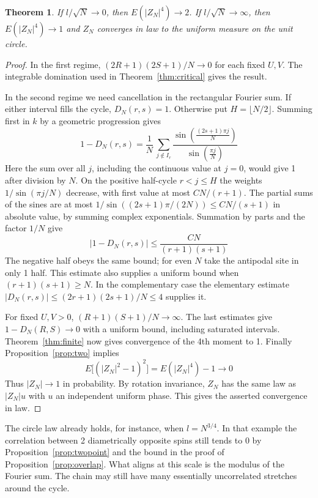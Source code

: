 \documentclass[11pt,a4paper]{article}
\newtheorem{thm}{Theorem}[section]
\theoremstyle{remark}
\begin{document}
\begin{samepage}
\begin{thm}\label{thm:sides}
If $l/\sqrt N\to0$, then $E(|Z_N|^4)\to2$. If $l/\sqrt N\to\infty$,
then $E(|Z_N|^4)\to1$ and $Z_N$ converges in law to the uniform measure
on the unit circle.
\end{thm}
\end{samepage}
\begin{proof}
In the first regime, $(2R+1)(2S+1)/N\to0$ for each fixed $U,V$. The
integrable domination used in Theorem~\ref{thm:critical} gives the result.

In the second regime we need cancellation in the rectangular Fourier sum.
If either interval fills the cycle, $D_N(r,s)=1$. Otherwise put
$H=\lfloor N/2\rfloor$. Summing first in $k$ by a geometric progression
gives
\[
   1-D_N(r,s)=\frac1N\,\sum_{j\notin I_r}
     \frac{\sin\left(\frac{(2s+1)\pi j}{N}\right)}{\sin\left(\frac{\pi j}{N}\right)}
\]
Here the sum over all $j$, including the continuous value at $j=0$,
would give 1 after division by $N$. On the positive half-cycle
$r<j\le H$ the weights $1/\sin(\pi j/N)$ decrease, with first value
at most $C N/(r+1)$. The partial sums of the sines are at most
$1/\sin((2s+1)\pi/(2N))\le C N/(s+1)$ in absolute value, by summing
complex exponentials. Summation by parts and the factor $1/N$ give
\[
    |1-D_N(r,s)|\le\frac{C N}{(r+1)(s+1)}
\]
The negative half obeys the same bound; for even $N$ take the antipodal
site in only 1 half. This estimate also supplies a uniform bound when
$(r+1)(s+1)\ge N$. In the complementary case the elementary estimate
$|D_N(r,s)|\le (2r+1)(2s+1)/N\le4$ supplies it.

For fixed $U,V>0$, $(R+1)(S+1)/N\to\infty$. The last estimates give
$1-D_N(R,S)\to0$ with a uniform bound, including saturated intervals.
Theorem~\ref{thm:finite} now gives convergence of the 4th moment to 1.
Finally Proposition~\ref{prop:two} implies
\[
    E\big[(|Z_N|^2-1)^2\big]=E(|Z_N|^4)-1\to0
\]
Thus $|Z_N|\to1$ in probability. By rotation invariance, $Z_N$ has the
same law as $|Z_N|u$ with $u$ an independent uniform phase. This gives
the asserted convergence in law.
\end{proof}

The circle law already holds, for instance, when $l=N^{3/4}$. In that
example the correlation between 2 diametrically opposite spins still
tends to 0 by Proposition~\ref{prop:twopoint} and the bound in the
proof of Proposition~\ref{prop:overlap}. What aligns at this scale is the
modulus of the Fourier sum. The chain may still have many essentially
uncorrelated stretches around the cycle.
\end{document}
